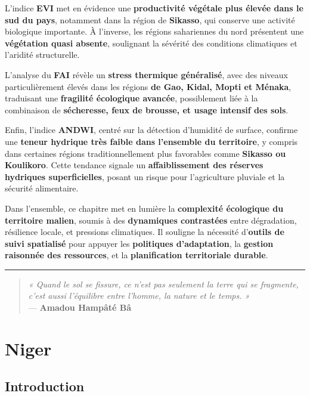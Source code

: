 \documentclass[
]{book}
\begin{document}
L'indice \textbf{EVI} met en évidence une \textbf{productivité végétale plus élevée dans le sud du pays}, notamment dans la région de \textbf{Sikasso}, qui conserve une activité biologique importante. À l'inverse, les régions sahariennes du nord présentent une \textbf{végétation quasi absente}, soulignant la sévérité des conditions climatiques et l'aridité structurelle.

L'analyse du \textbf{FAI} révèle un \textbf{stress thermique généralisé}, avec des niveaux particulièrement élevés dans les régions \textbf{de Gao, Kidal, Mopti et Ménaka}, traduisant une \textbf{fragilité écologique avancée}, possiblement liée à la combinaison de \textbf{sécheresse, feux de brousse, et usage intensif des sols}.

Enfin, l'indice \textbf{ANDWI}, centré sur la détection d'humidité de surface, confirme une \textbf{teneur hydrique très faible dans l'ensemble du territoire}, y compris dans certaines régions traditionnellement plus favorables comme \textbf{Sikasso ou Koulikoro}. Cette tendance signale un \textbf{affaiblissement des réserves hydriques superficielles}, posant un risque pour l'agriculture pluviale et la sécurité alimentaire.

Dans l'ensemble, ce chapitre met en lumière la \textbf{complexité écologique du territoire malien}, soumis à des \textbf{dynamiques contrastées} entre dégradation, résilience locale, et pressions climatiques. Il souligne la nécessité d'\textbf{outils de suivi spatialisé} pour appuyer les \textbf{politiques d'adaptation}, la \textbf{gestion raisonnée des ressources}, et la \textbf{planification territoriale durable}.

\begin{center}\rule{0.5\linewidth}{0.5pt}\end{center}

\begin{quote}
\emph{« Quand le sol se fissure, ce n'est pas seulement la terre qui se fragmente, c'est aussi l'équilibre entre l'homme, la nature et le temps. »}\\
--- \textbf{Amadou Hampâté Bâ}
\end{quote}

\chapter{Niger}\label{niger}

\section{Introduction}\label{introduction-3}
\end{document}
